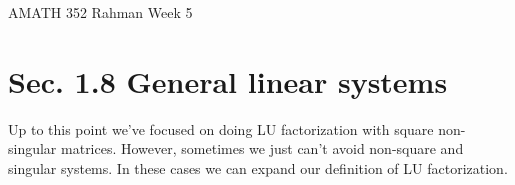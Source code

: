 \documentclass[reqno]{amsart}
\theoremstyle{definition}
\begin{document}
\begin{flushleft}
{\sc \Large AMATH 352 Rahman} \hfill Week 5
\bigskip
\end{flushleft}

\newcommand{\R}{\mathbb{R}}
\newcommand{\N}{\mathbb{N}}
\newcommand{\Z}{\mathbb{Z}}
\newcommand{\Q}{\mathbb{Q}}
\renewcommand{\CancelColor}{\color{red}}
\newcommand{\?}{\stackrel{?}{=}}
\renewcommand{\varphi}{\phi}
\newcommand{\card}{\text{Card}}
\newcommand{\bigzero}{\text{\Huge 0}}
\newcommand{\curvearrowdown}{{\color{red}\rotatebox{90}{$\curvearrowleft$}}}
\newcommand{\curvearrowup}{{\color{red}\rotatebox{90}{$\curvearrowright$}}}



\section*{Sec. 1.8 General linear systems}

Up to this point we've focused on doing LU factorization with square non-singular matrices.  However, sometimes we just can't avoid non-square and singular systems.  In these cases we can expand our definition of LU factorization.
\end{document}
